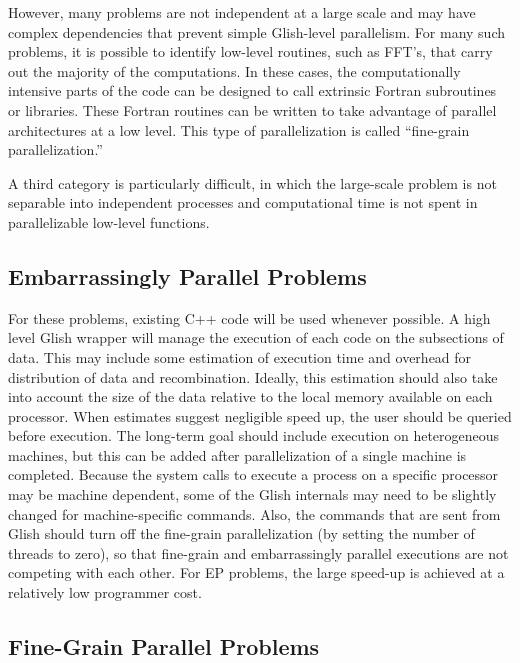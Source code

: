 However, many problems are not independent at a large scale and may
have complex dependencies that prevent simple Glish-level parallelism.
For many such problems, it is possible to identify low-level routines,
such as FFT's, that carry out the majority of the computations.  In
these cases, the computationally intensive parts of the code can be
designed to call extrinsic Fortran subroutines or libraries.  These
Fortran routines can be written to take advantage of parallel
architectures at a low level.  This type of parallelization is called
``fine-grain parallelization.''

A third category is particularly difficult, in which the large-scale
problem is not separable into independent processes and computational
time is not spent in parallelizable low-level functions.  

\subsection{Embarrassingly Parallel Problems}

For these problems, existing C++ code will be used whenever possible.
A high level Glish wrapper will manage the execution of each code on
the subsections of data.  This may include some estimation of
execution time and overhead for distribution of data and
recombination.  Ideally, this estimation should also take into account
the size of the data relative to the local memory available on each
processor.  When estimates suggest negligible speed up, the user
should be queried before execution.  The long-term goal should include
execution on heterogeneous machines, but this can be added after
parallelization of a single machine is completed.  Because the system
calls to execute a process on a specific processor may be machine
dependent, some of the Glish internals may need to be slightly changed
for machine-specific commands.  Also, the commands that are sent from
Glish should turn off the fine-grain parallelization (by setting the
number of threads to zero), so that fine-grain and embarrassingly
parallel executions are not competing with each other.  For EP
problems, the large speed-up is achieved at a relatively low
programmer cost.

\subsection{Fine-Grain Parallel Problems}

